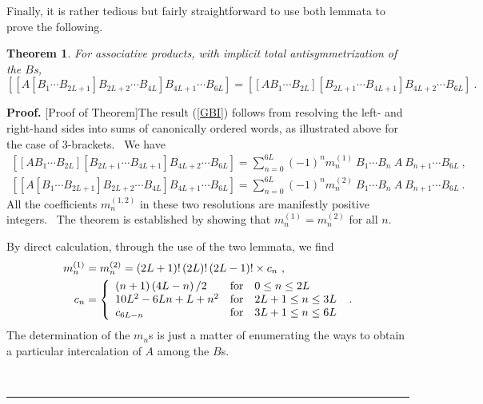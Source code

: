 \documentclass[aps,preprint,tightenlines,unsortedaddress,11pt]{revtex4}\usepackage{amsfonts}
\newtheorem{theorem}{Theorem}
\newenvironment{proof}[1][Proof]{\noindent\textbf{#1.} }{\ \rule{0.5em}{0.5em}}
\begin{document}
\noindent Finally, it is rather tedious but fairly straightforward to use both
lemmata to prove the following.

\begin{theorem}
For associative products, with implicit total antisymmetrization of the $B$s,\begin{equation}
\left[  \left[  A\left[  B_{1}\cdots B_{2L+1}\right]  B_{2L+2}\cdots
B_{4L}\right]  B_{4L+1}\cdots B_{6L}\right]  =\left[  \left[  AB_{1}\cdots
B_{2L}\right]  \left[  B_{2L+1}\cdots B_{4L+1}\right]  B_{4L+2}\cdots
B_{6L}\right]  \ . \label{GBI}\end{equation}

\end{theorem}

\begin{proof}
[Proof of Theorem]The result (\ref{GBI}) follows from resolving the left- and
right-hand sides into sums of canonically ordered words, as illustrated above
for the case of $3$-brackets. \ We have
\begin{gather}
\left[  \left[  AB_{1}\cdots B_{2L}\right]  \left[  B_{2L+1}\cdots
B_{4L+1}\right]  B_{4L+2}\cdots B_{6L}\right]  =\sum_{n=0}^{6L}\left(
-1\right)  ^{n}m_{n}^{\left(  1\right)  }~B_{1}\cdots B_{n}~A~B_{n+1}\cdots
B_{6L}\ ,\nonumber\\
\left[  \left[  A\left[  B_{1}\cdots B_{2L+1}\right]  B_{2L+2}\cdots
B_{4L}\right]  B_{4L+1}\cdots B_{6L}\right]  =\sum_{n=0}^{6L}\left(
-1\right)  ^{n}m_{n}^{\left(  2\right)  }~B_{1}\cdots B_{n}~A~B_{n+1}\cdots
B_{6L}\ .
\end{gather}
All the coefficients $m_{n}^{\left(  1,2\right)  }$ in these two resolutions
are manifestly positive integers. \ The theorem is established by showing that
$m_{n}^{\left(  1\right)  }=m_{n}^{\left(  2\right)  }$ for all $n$.

By direct calculation, through the use of the two lemmata, we find
\begin{align}
m_{n}^{\left(  1\right)  }  &  =m_{n}^{\left(  2\right)  }=\left(
2L+1\right)  !\left(  2L\right)  !\left(  2L-1\right)  !\times c_{n}\ ,\label{Mn}\\
c_{n}  &  =\left\{
\begin{array}
[c]{ll}\left(  n+1\right)  \left(  4L-n\right)  /2 & \text{for \ \ }0\leq n\leq2L\\
10L^{2}-6Ln+L+n^{2} & \text{for \ \ }2L+1\leq n\leq3L\\
c_{6L-n} & \text{for \ \ }3L+1\leq n\leq6L
\end{array}
\right.  \ . \label{Cn}\end{align}
The determination of the $m_{n}$s is just a matter of enumerating the ways to
obtain a particular intercalation of $A$ among the $B$s. \ 


\end{proof}
\end{document}
